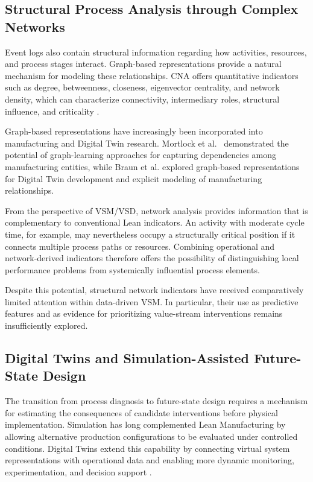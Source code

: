 \documentclass[pdflatex,iicol,Numbered,sn-basic]{sn-jnl}
\begin{document}
\subsection{Structural Process Analysis through Complex Networks}

Event logs also contain structural information regarding how activities,
resources, and process stages interact. Graph-based representations provide a
natural mechanism for modeling these relationships. CNA offers quantitative indicators such as degree, betweenness, closeness,
eigenvector centrality, and network density, which can characterize
connectivity, intermediary roles, structural influence, and criticality
\cite{freeman1978centrality,newman2018networks}.

Graph-based representations have increasingly been incorporated into
manufacturing and Digital Twin research. Mortlock et al.~\cite{Mortlock2021GraphLearningDT} demonstrated the potential of graph-learning
approaches for capturing dependencies among manufacturing entities, while Braun
et al. \cite{Braun2022GraphBasedDT} explored graph-based representations for
Digital Twin development and explicit modeling of manufacturing relationships.

From the perspective of VSM/VSD, network analysis provides information that is
complementary to conventional Lean indicators. An activity with moderate cycle
time, for example, may nevertheless occupy a structurally critical position if
it connects multiple process paths or resources. Combining operational and
network-derived indicators therefore offers the possibility of distinguishing
local performance problems from systemically influential process elements.

Despite this potential, structural network indicators have received
comparatively limited attention within data-driven VSM. In particular, their
use as predictive features and as evidence for prioritizing value-stream
interventions remains insufficiently explored.

\subsection{Digital Twins and Simulation-Assisted Future-State Design}

The transition from process diagnosis to future-state design requires a
mechanism for estimating the consequences of candidate interventions before
physical implementation. Simulation has long complemented Lean Manufacturing
by allowing alternative production configurations to be evaluated under
controlled conditions. Digital Twins extend this capability by connecting
virtual system representations with operational data and enabling more dynamic
monitoring, experimentation, and decision support
\cite{GrievesVickers2017}.
\end{document}

